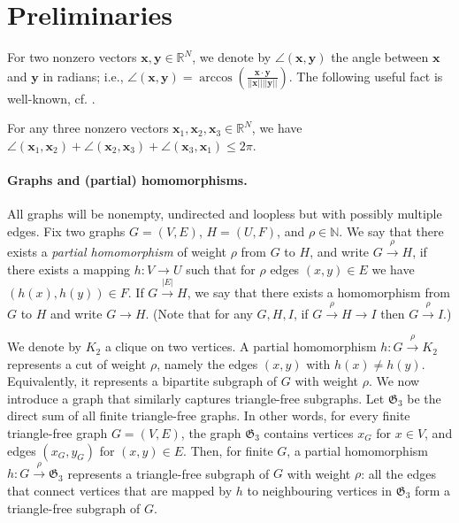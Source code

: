 \documentclass[a4paper,11pt, DIV=11]{scrartcl}
\newcommand{\vx}{\ensuremath{\mathbf{x}}}
\newcommand{\vy}{\ensuremath{\mathbf{y}}}
\renewcommand{\G}{\ensuremath{\mathfrak{G}}}
\newcommand{\N}{\ensuremath{\mathbb{N}}}
\renewcommand{\R}{\ensuremath{\mathbb{R}}}
\theoremstyle{plain}
\theoremstyle{definition}
\begin{document}
\section{Preliminaries}\label{sec:prelims}

For two nonzero vectors $\vx, \vy\in \R^N$, we denote by $\angle(\vx, \vy)$ the angle between $\vx$ and $\vy$ in radians; i.e.,
$\angle(\vx, \vy) = \arccos\left( \frac{\vx \cdot \vy}{||\vx|| ||\vy||}\right)$.
The following useful fact is well-known, cf. \cite[Book \textsc{xi}, Proposition 21]{euclid}.

\begin{lemma}\label{lem:noTriangles}
    For any three nonzero vectors $\vx_1, \vx_2, \vx_3 \in \R^N$, we have
    $\angle(\vx_1, \vx_2) + \angle(\vx_2, \vx_3) + \angle(\vx_3, \vx_1) \leq 2\pi $.
\end{lemma}

\paragraph{Graphs and (partial) homomorphisms.}
All graphs will be nonempty, undirected and loopless but with possibly multiple edges.
Fix two  graphs $G = (V, E)$, $H = (U, F)$, and $\rho \in \N$. We say that there exists a 
\emph{partial homomorphism} of weight $\rho$ from $G$ to $H$, and write $G \xrightarrow{\rho} H$, if there exists a mapping $h : V \to U$ such that for $\rho$ edges $(x, y) \in E$ we have $(h(x), h(y)) \in F$. If $G \xrightarrow{|E|} H$, we say that there exists a homomorphism from $G$ to $H$ and write $G \to H$. (Note that for any $G, H, I$, if $G \xrightarrow{\rho} H \rightarrow I$  then $G \xrightarrow{\rho} I$.)

We denote by $K_2$ a clique on two vertices.
A partial homomorphism $h:G \xrightarrow{\rho}K_2$ represents a cut of weight $\rho$, namely the edges $(x,y)$ with $h(x)\neq h(y)$. Equivalently, it represents a bipartite subgraph of $G$ with weight $\rho$. We now introduce a graph that similarly captures triangle-free subgraphs.
Let $\G_3$ be the direct sum of all finite triangle-free graphs. In other words, for every finite triangle-free graph $G = (V, E)$, the graph $\G_3$ contains vertices $x_G$ for $x \in V$, and edges $(x_G, y_G)$ for $(x, y) \in E$. Then, for finite $G$, a partial homomorphism $h : G \xrightarrow{\rho} \G_3$ represents a triangle-free subgraph of $G$ with weight $\rho$: all the edges that connect vertices that are mapped by $h$ to neighbouring vertices in $\G_3$ form a triangle-free subgraph of $G$.
\end{document}
